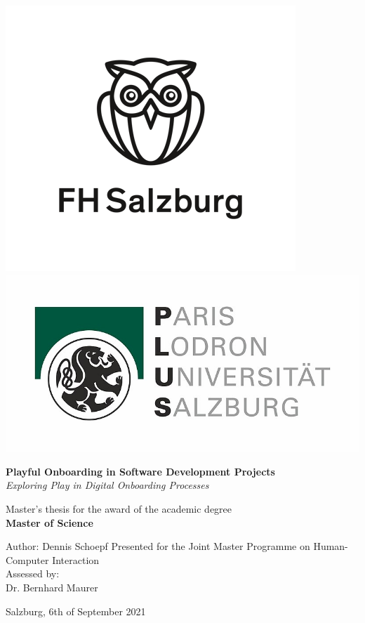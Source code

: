 \begin{titlepage}

  \raggedleft
  \includegraphics[totalheight=3cm]{./images/fhsalzburg.png}
  \includegraphics[totalheight=3cm]{./images/unisalzburg.jpg}
  \vspace{1.6cm}

  \raggedright
  \begin{spacing}{1.1}
    {\huge\bfseries Playful Onboarding in Software Development Projects\\}
    \vspace{0.4cm}
    {\large \textit{Exploring Play in Digital Onboarding Processes}}
  \end{spacing}

  \vspace{1cm}
  {Master's thesis for the award of the academic degree\\}
  {\large\bfseries Master of Science\\}

  \vspace{0.3cm}
  {Author: Dennis Schoepf}
  \vfill
  {Presented for the Joint Master Programme on Human-Computer Interaction\\}
  \vspace{0.3cm}
  {Assessed by:\\}
  {Dr. Bernhard Maurer\\}
  \vspace{1cm}
  {Salzburg, 6th of September 2021\par}
\end{titlepage}
